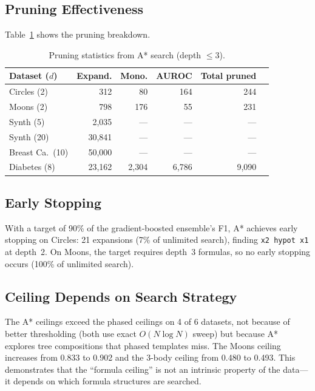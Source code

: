 \documentclass[journal]{IEEEtran}
\begin{document}
\subsection{Pruning Effectiveness}

Table~\ref{tab:pruning_stats} shows the pruning breakdown.

\begin{table}[h]
\caption{Pruning statistics from A* search (depth $\leq 3$).}
\label{tab:pruning_stats}
\scriptsize
\begin{tabular}{@{}lrrrrr@{}}
\toprule
Dataset ($d$) & Expand. & Mono. & AUROC & Total pruned \\
\midrule
Circles (2) & 312 & 80 & 164 & 244 \\
Moons (2) & 798 & 176 & 55 & 231 \\
Synth (5) & 2{,}035 & --- & --- & --- \\
Synth (20) & 30{,}841 & --- & --- & --- \\
Breast Ca.\ (10) & 50{,}000 & --- & --- & --- \\
Diabetes (8) & 23{,}162 & 2{,}304 & 6{,}786 & 9{,}090 \\
\bottomrule
\end{tabular}
\end{table}

\subsection{Early Stopping}

With a target of 90\% of the gradient-boosted ensemble's F1, A*
achieves early stopping on Circles: 21 expansions (7\% of unlimited
search), finding \texttt{x2 hypot x1} at depth~2. On Moons, the
target requires depth~3 formulas, so no early stopping occurs
(100\% of unlimited search).

\subsection{Ceiling Depends on Search Strategy}

The A* ceilings exceed the phased ceilings on 4 of 6 datasets,
not because of better thresholding (both use exact $O(N\log N)$
sweep) but because A* explores tree compositions that phased
templates miss. The Moons ceiling increases from 0.833 to 0.902
and the 3-body ceiling from 0.480 to 0.493. This demonstrates
that the ``formula ceiling'' is not an intrinsic property of the
data---it depends on which formula structures are searched.
\end{document}
